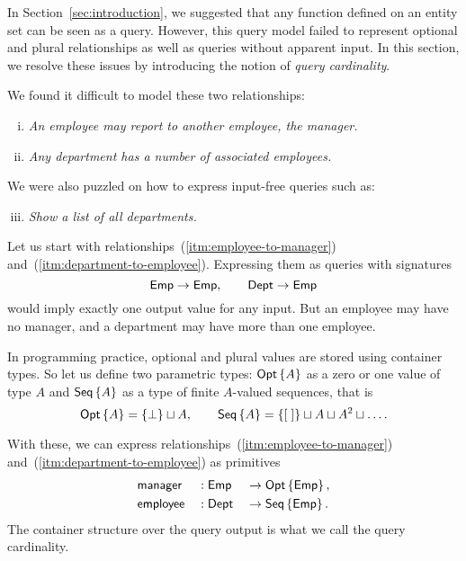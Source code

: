 In Section~\ref{sec:introduction}, we suggested that any function defined on an
entity set can be seen as a query.  However, this query model failed to
represent optional and plural relationships as well as queries without apparent
input.  In this section, we resolve these issues by introducing the notion of
\emph{query cardinality}.

We found it difficult to model these two relationships:

\begin{enumerate}[(i)]
\item \label{itm:employee-to-manager}
\emph{An employee may report to another employee, the manager.}

\item \label{itm:department-to-employee}
\emph{Any department has a number of associated employees.}
\end{enumerate}

We were also puzzled on how to express input-free queries such as:

\begin{enumerate}[(i)]
\setcounter{enumi}{2}
\item \label{itm:department-set}
\emph{Show a list of all departments.}
\end{enumerate}

Let us start with relationships~(\ref{itm:employee-to-manager})
and~(\ref{itm:department-to-employee}).  Expressing them as queries with
signatures
\begin{equation*}
    \textup{\textsf{Emp}} \to \textup{\textsf{Emp}}, \qquad \textup{\textsf{Dept}} \to \textup{\textsf{Emp}}
\end{equation*}
would imply exactly one output value for any input.  But an employee may have
no manager, and a department may have more than one employee.

In programming practice, optional and plural values are stored using container
types.  So let us define two parametric types: $\textup{\textsf{Opt}}\left\{A\right\}$ as a zero or one value
of type $A$ and $\textup{\textsf{Seq}}\left\{A\right\}$ as a type of finite $A$-valued sequences, that is
\begin{equation*}
\textup{\textsf{Opt}}\left\{A\right\} = \{\bot\} \sqcup A, \qquad
\textup{\textsf{Seq}}\left\{A\right\} = \{[\;]\} \sqcup A \sqcup A^2 \sqcup \ldots.
\end{equation*}

With these, we can express relationships~(\ref{itm:employee-to-manager})
and~(\ref{itm:department-to-employee}) as primitives
\begin{alignat*}{3}
    & \textup{\textsf{manager}} && : \textup{\textsf{Emp}} && \to \textup{\textsf{Opt}}\left\{\textup{\textsf{Emp}}\right\}, \\
    & \textup{\textsf{employee}} && : \textup{\textsf{Dept}} && \to \textup{\textsf{Seq}}\left\{\textup{\textsf{Emp}}\right\}.
\end{alignat*}
The container structure over the query output is what we call the query
cardinality.

